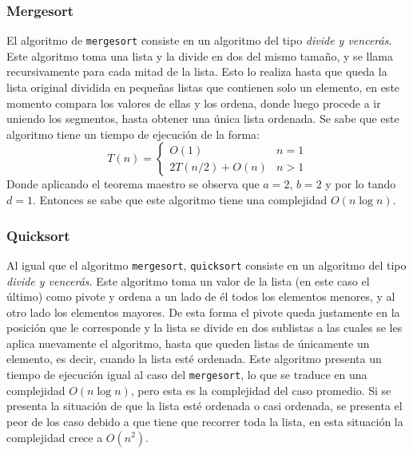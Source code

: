 \subsubsection{Mergesort}

El algoritmo de \texttt{mergesort} consiste en un algoritmo del tipo \textit{divide y vencerás}. Este algoritmo toma una lista y la divide en dos del mismo tamaño, y se llama recursivamente para cada mitad de la lista. Esto lo realiza hasta que queda la lista original dividida en pequeñas listas que contienen solo un elemento, en este momento compara los valores de ellas y los ordena, donde luego procede a ir uniendo los segmentos, hasta obtener una única lista ordenada. Se sabe que este algoritmo tiene un tiempo de ejecución de la forma\cite{R3}:
\begin{equation}
    T(n)=\left\lbrace
\begin{array}{ll}
 O(1) & n=1\\
 2T(n/2)+O(n) & n>1
\end{array}
\right.
\end{equation}
Donde aplicando el teorema maestro se observa que $a=2$, $b=2$ y por lo tando $d=1$. Entonces se sabe que este algoritmo tiene una complejidad $O(n\log{n})$. 

\subsubsection{Quicksort}
Al igual que el algoritmo \texttt{mergesort}, \texttt{quicksort} consiste en un algoritmo del tipo \textit{divide y vencerás}. Este algoritmo toma un valor de la lista (en este caso el último) como pivote y ordena a un lado de él todos los elementos menores, y al otro lado los elementos mayores. De esta forma el pivote queda justamente en la posición que le corresponde y la lista se divide en dos sublistas a las cuales se les aplica nuevamente el algoritmo, hasta que queden listas de únicamente un elemento, es decir, cuando la lista esté ordenada. Este algoritmo presenta un tiempo de ejecución igual al caso del \texttt{mergesort}, lo que se traduce en una complejidad $O(n\log n)$, pero esta es la complejidad del caso promedio. Si se presenta la situación de que la lista esté ordenada o casi ordenada, se presenta el peor de los caso debido a que tiene que recorrer toda la lista, en esta situación la complejidad crece a $O(n^2)$\cite{R3}.  

